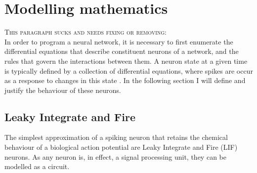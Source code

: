 \section{Modelling mathematics}

\textsc{This paragraph sucks and needs fixing or removing:} \\
In order to program a neural network, it is necessary to first enumerate the
differential equations that describe constituent neurons of a network, and the
rules that govern the interactions between them. A neuron
state at a given time is typically defined by a collection of differential
equations, where spikes are occur as a response to changes in this state \autocite{brette_simulation_2007}. In the
following section I will define and justify the behaviour of these neurons.

\subsection{Leaky Integrate and Fire}

The simplest approximation of a spiking neuron that retains the chemical
behaviour of a biological action potential are Leaky Integrate and Fire (LIF)
neurons. As any neuron is, in effect, a signal processing unit, they can be
modelled as a circuit.

